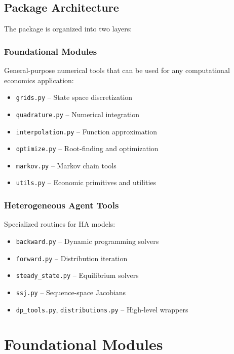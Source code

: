 \documentclass[12pt]{book}
\begin{document}
\begin{onehalfspacing}
\section{Package Architecture}

The package is organized into two layers:

\subsection{Foundational Modules}
General-purpose numerical tools that can be used for any computational economics application:
\begin{itemize}
    \item \texttt{grids.py} -- State space discretization
    \item \texttt{quadrature.py} -- Numerical integration
    \item \texttt{interpolation.py} -- Function approximation
    \item \texttt{optimize.py} -- Root-finding and optimization
    \item \texttt{markov.py} -- Markov chain tools
    \item \texttt{utils.py} -- Economic primitives and utilities
\end{itemize}

\subsection{Heterogeneous Agent Tools}
Specialized routines for HA models:
\begin{itemize}
    \item \texttt{backward.py} -- Dynamic programming solvers
    \item \texttt{forward.py} -- Distribution iteration
    \item \texttt{steady\_state.py} -- Equilibrium solvers
    \item \texttt{ssj.py} -- Sequence-space Jacobians
    \item \texttt{dp\_tools.py}, \texttt{distributions.py} -- High-level wrappers
\end{itemize}

\chapter{Foundational Modules}


\end{onehalfspacing}
\end{document}
